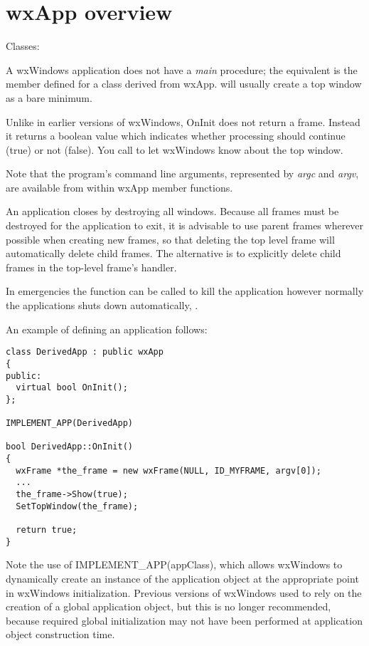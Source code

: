 \section{wxApp overview}\label{wxappoverview}

Classes: 

A wxWindows application does not have a {\it main} procedure; the equivalent is the
\rtfsp{} member defined for a class derived from wxApp.\rtfsp
{} will usually create a top window as a bare minimum.

Unlike in earlier versions of wxWindows, OnInit does not return a frame. Instead it
returns a boolean value which indicates whether processing should continue (true) or not (false).
You call  to let wxWindows know
about the top window.

Note that the program's command line arguments, represented by {\it argc} 
and {\it argv}, are available from within wxApp member functions.

An application closes by destroying all windows. Because all frames must
be destroyed for the application to exit, it is advisable to use parent
frames wherever possible when creating new frames, so that deleting the
top level frame will automatically delete child frames. The alternative
is to explicitly delete child frames in the top-level frame's \rtfsp
handler.

In emergencies the  function can be called to kill the
application however normally the applications shuts down automatically, 
.

An example of defining an application follows:

\begin{verbatim}
class DerivedApp : public wxApp
{
public:
  virtual bool OnInit();
};

IMPLEMENT_APP(DerivedApp)

bool DerivedApp::OnInit()
{
  wxFrame *the_frame = new wxFrame(NULL, ID_MYFRAME, argv[0]);
  ...
  the_frame->Show(true);
  SetTopWindow(the_frame);

  return true;
}
\end{verbatim}

Note the use of IMPLEMENT\_APP(appClass), which allows wxWindows to dynamically create an instance of the application object
at the appropriate point in wxWindows initialization. Previous versions of wxWindows used
to rely on the creation of a global application object, but this is no longer recommended,
because required global initialization may not have been performed at application object
construction time.

